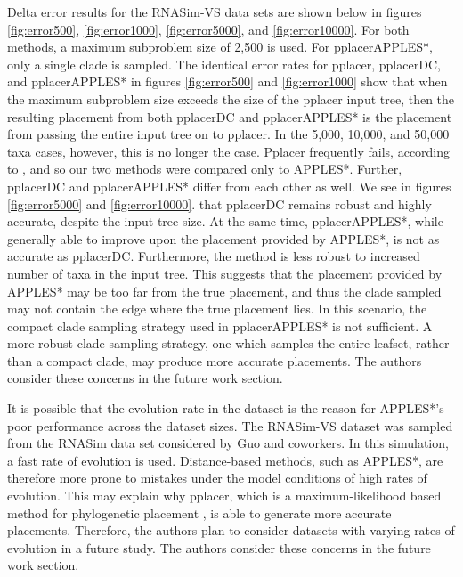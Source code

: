 \documentclass[10pt]{article}
\begin{document}
Delta error results for the RNASim-VS data sets
are shown below in figures
\ref{fig:error500},
\ref{fig:error1000},
\ref{fig:error5000},
and
\ref{fig:error10000}.
For both methods, a maximum subproblem size of 2,500 is used.
For pplacerAPPLES*, only a single clade is sampled.
The identical error rates for pplacer, pplacerDC, and pplacerAPPLES* in figures \ref{fig:error500} and \ref{fig:error1000}
show that when the maximum subproblem size exceeds the size of the pplacer input tree, then the resulting placement from both pplacerDC and pplacerAPPLES* is the placement from passing the entire input tree on to pplacer.
In the 5,000, 10,000, and 50,000 taxa cases,  however, this is no longer the case.
Pplacer frequently fails, according to \cite{balaban_apples_2020}, and so our two methods were compared only to APPLES*. Further, pplacerDC and pplacerAPPLES* differ from each other as well.
We see in figures \ref{fig:error5000} and \ref{fig:error10000}.%
that pplacerDC remains robust and highly accurate, despite the input tree size.
At the same time, pplacerAPPLES*, while generally able to improve upon the
placement provided by APPLES*, is not as accurate as pplacerDC.
Furthermore, the method is less robust to increased number of taxa in the input tree.
This suggests that the placement provided by APPLES* may
be too far from the true placement, and thus the clade sampled may not contain
the edge where the true placement lies.
In this scenario, the compact clade sampling strategy used in pplacerAPPLES*
is not sufficient.
A more robust clade sampling strategy, one which samples the entire leafset,
rather than a compact clade, may produce more accurate placements.
The authors consider these concerns in the future work section.

It is possible that the evolution rate in the dataset is the reason for APPLES*'s poor performance across the dataset sizes.
The RNASim-VS dataset was sampled from the RNASim data set considered by Guo and coworkers\cite{guo}.
In this simulation, a fast rate of evolution is used.
Distance-based methods, such as APPLES*, are therefore more prone to mistakes
under the model conditions of high rates of evolution.
This may explain why pplacer, which is a maximum-likelihood based method for phylogenetic placement \cite{matsen_pplacer_2010},
is able to generate more accurate placements.
Therefore, the authors plan to consider datasets with varying rates of evolution in a future study.
The authors consider these concerns in the future work section.
\end{document}

